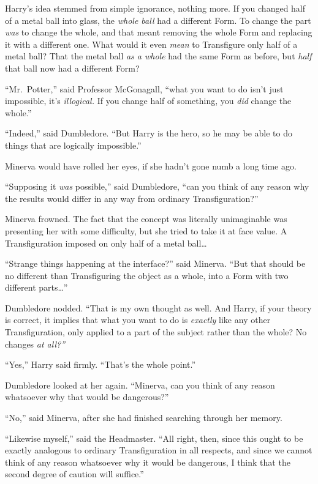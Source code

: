 Harry's idea stemmed from simple ignorance, nothing more. If you changed
half of a metal ball into glass, the \emph{whole ball} had a different
Form. To change the part \emph{was} to change the whole, and that meant
removing the whole Form and replacing it with a different one. What
would it even \emph{mean} to Transfigure only half of a metal ball? That
the metal ball \emph{as a whole} had the same Form as before, but
\emph{half} that ball now had a different Form?

``Mr.~Potter,'' said Professor McGonagall, ``what you want to do isn't
just impossible, it's \emph{illogical.} If you change half of something,
you \emph{did} change the whole.''

``Indeed,'' said Dumbledore. ``But Harry is the hero, so he may be able
to do things that are logically impossible.''

Minerva would have rolled her eyes, if she hadn't gone numb a long time
ago.

``Supposing it \emph{was} possible,'' said Dumbledore, ``can you think
of any reason why the results would differ in any way from ordinary
Transfiguration?''

Minerva frowned. The fact that the concept was literally unimaginable
was presenting her with some difficulty, but she tried to take it at
face value. A Transfiguration imposed on only half of a metal
ball\ldots{}

``Strange things happening at the interface?'' said Minerva. ``But that
should be no different than Transfiguring the object as a whole, into a
Form with two different parts\ldots{}''

Dumbledore nodded. ``That is my own thought as well. And Harry, if your
theory is correct, it implies that what you want to do is \emph{exactly}
like any other Transfiguration, only applied to a part of the subject
rather than the whole? No changes \emph{at all?''}

``Yes,'' Harry said firmly. ``That's the whole point.''

Dumbledore looked at her again. ``Minerva, can you think of any reason
whatsoever why that would be dangerous?''

``No,'' said Minerva, after she had finished searching through her
memory.

``Likewise myself,'' said the Headmaster. ``All right, then, since this
ought to be exactly analogous to ordinary Transfiguration in all
respects, and since we cannot think of any reason whatsoever why it
would be dangerous, I think that the second degree of caution will
suffice.''

